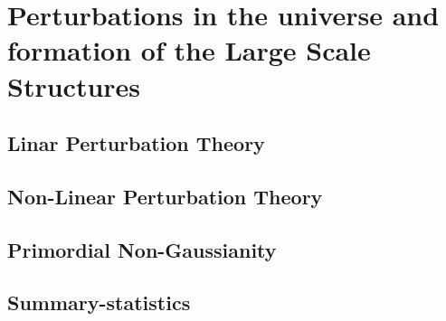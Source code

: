  \chapter{Perturbations in the universe and formation of the Large Scale Structures}

 \section{Linar Perturbation Theory}
 \section{Non-Linear Perturbation Theory}
 \section{Primordial Non-Gaussianity}
 \section{Summary-statistics}
 